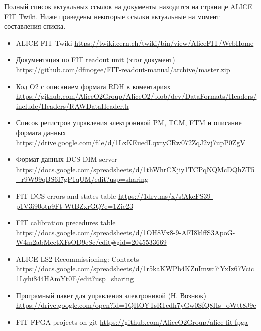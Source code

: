 \documentclass{article}
\begin{document}
Полный список актуальных ссылок на документы находится на странице  ALICE FIT Twiki. Ниже приведены некоторые ссылки актуальные на момент составления списка.

\begin{itemize}
\item ALICE FIT Twiki
\url {https://twiki.cern.ch/twiki/bin/view/AliceFIT/WebHome}

\item Документация по FIT readout unit (этот документ)
\url{https://github.com/dfinogee/FIT-readout-manual/archive/master.zip}

\item Код O2 с описанием формата RDH в коментариях
\url{https://github.com/AliceO2Group/AliceO2/blob/dev/DataFormats/Headers/include/Headers/RAWDataHeader.h}

\item Список регистров управления электроникой PM, TCM, FTM и описание формата данных
\url{https://drive.google.com/file/d/1LxKEuedLqxtyCRw072ZqJ2vj7upP0ZgV}

\item Формат данных DCS DIM server
\url {https://docs.google.com/spreadsheets/d/1thWhrCXjiy1TCPqNQMcDQhZT5_r9W99qBS6I7gP1qUM/edit?usp=sharing}

\item FIT DCS errors and states table
\url {https://1drv.ms/x/s!AkcFS39-p1V3i90otp9Ft-WtBZxrGQ?e=1Zie23}

\item FIT calibration precedures table
\url {https://docs.google.com/spreadsheets/d/1OH8Vx8-9-AFI8klffS3ApoG-W4m2abMectXFsOD9eSc/edit#gid=2045533669}

\item ALICE LS2 Recommissioning: Contacts
\url {https://docs.google.com/spreadsheets/d/1r5kaKWPb4KZuImwc7iYxIz67Vcic1Lyhi844HAmYt0E/edit?usp=sharing}

\item Програмный пакет для управления электроникой (Н. Вознюк)
\url {https://drive.google.com/open?id=1QItOYTsRTcdh7yGw0SfQ8Hs_oWtt8J9e}

\item FIT FPGA projects on git
\url {https://github.com/AliceO2Group/alice-fit-fpga}

\end{itemize}
\end{document}
